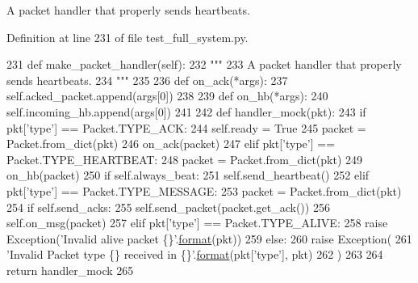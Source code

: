 \begin{DoxyVerb}A packet handler that properly sends heartbeats.
\end{DoxyVerb}
 

Definition at line 231 of file test\+\_\+full\+\_\+system.\+py.


\begin{DoxyCode}
231     \textcolor{keyword}{def }make\_packet\_handler(self):
232         \textcolor{stringliteral}{"""}
233 \textcolor{stringliteral}{        A packet handler that properly sends heartbeats.}
234 \textcolor{stringliteral}{        """}
235 
236         \textcolor{keyword}{def }on\_ack(*args):
237             self.acked\_packet.append(args[0])
238 
239         \textcolor{keyword}{def }on\_hb(*args):
240             self.incoming\_hb.append(args[0])
241 
242         \textcolor{keyword}{def }handler\_mock(pkt):
243             \textcolor{keywordflow}{if} pkt[\textcolor{stringliteral}{'type'}] == Packet.TYPE\_ACK:
244                 self.ready = \textcolor{keyword}{True}
245                 packet = Packet.from\_dict(pkt)
246                 on\_ack(packet)
247             \textcolor{keywordflow}{elif} pkt[\textcolor{stringliteral}{'type'}] == Packet.TYPE\_HEARTBEAT:
248                 packet = Packet.from\_dict(pkt)
249                 on\_hb(packet)
250                 \textcolor{keywordflow}{if} self.always\_beat:
251                     self.send\_heartbeat()
252             \textcolor{keywordflow}{elif} pkt[\textcolor{stringliteral}{'type'}] == Packet.TYPE\_MESSAGE:
253                 packet = Packet.from\_dict(pkt)
254                 \textcolor{keywordflow}{if} self.send\_acks:
255                     self.send\_packet(packet.get\_ack())
256                 self.on\_msg(packet)
257             \textcolor{keywordflow}{elif} pkt[\textcolor{stringliteral}{'type'}] == Packet.TYPE\_ALIVE:
258                 \textcolor{keywordflow}{raise} Exception(\textcolor{stringliteral}{'Invalid alive packet \{\}'}.\hyperlink{namespaceparlai_1_1chat__service_1_1services_1_1messenger_1_1shared__utils_a32e2e2022b824fbaf80c747160b52a76}{format}(pkt))
259             \textcolor{keywordflow}{else}:
260                 \textcolor{keywordflow}{raise} Exception(
261                     \textcolor{stringliteral}{'Invalid Packet type \{\} received in \{\}'}.\hyperlink{namespaceparlai_1_1chat__service_1_1services_1_1messenger_1_1shared__utils_a32e2e2022b824fbaf80c747160b52a76}{format}(pkt[\textcolor{stringliteral}{'type'}], pkt)
262                 )
263 
264         \textcolor{keywordflow}{return} handler\_mock
265 
\end{DoxyCode}
\mbox{\label{classparlai_1_1mturk_1_1core_1_1test_1_1test__full__system_1_1MockAgent_a2186b39ea12603dd9c80ca0fca2e6892}} 

